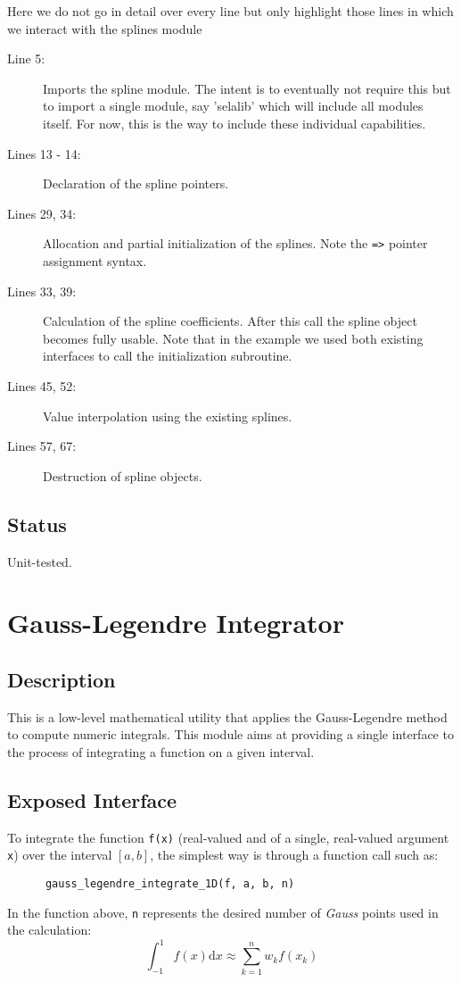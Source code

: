 \documentclass[]{report}   %
\begin{document}
Here we do not go in detail over every line but only highlight those lines in which we interact with the splines module
\begin{description}
\item[Line 5:]
Imports the spline module. The intent is to eventually not require this but to import a single module, say 'selalib' which will include all modules itself. For now, this is the way to include these individual capabilities.

\item[Lines 13 - 14: ]
Declaration of the spline pointers.

\item[Lines 29, 34:]
Allocation and partial initialization of the splines. Note the \verb+=>+ pointer assignment syntax.

\item[Lines 33, 39:]
Calculation of the spline coefficients. After this call the spline object becomes fully usable. Note that in the example we used both existing interfaces to call the initialization subroutine.
\item[Lines 45, 52:]
Value interpolation using the existing splines.

\item[Lines 57, 67:]
Destruction of spline objects.
\end{description}


\subsection{Status}
Unit-tested.

\section{Gauss-Legendre Integrator}

\subsection{Description}
This is a low-level mathematical utility that applies the Gauss-Legendre method to compute numeric integrals.  This module aims at providing a single interface to the process of integrating a function on a given interval.

\subsection{Exposed Interface}
To integrate the function \verb+f(x)+ (real-valued and of a single, real-valued argument \verb+x+) over the interval $[a, b]$, the simplest way is through a function call such as:
 \begin{verbatim}
      gauss_legendre_integrate_1D(f, a, b, n)
 \end{verbatim}
In the function above, \verb+n+ represents the desired number of \emph{Gauss} points used in the calculation:
\begin{equation}
\int_{-1}^1f(x) \mathrm{d} x \approx \sum_{k=1}^n w_kf(x_k)
\end{equation}
\end{document}
